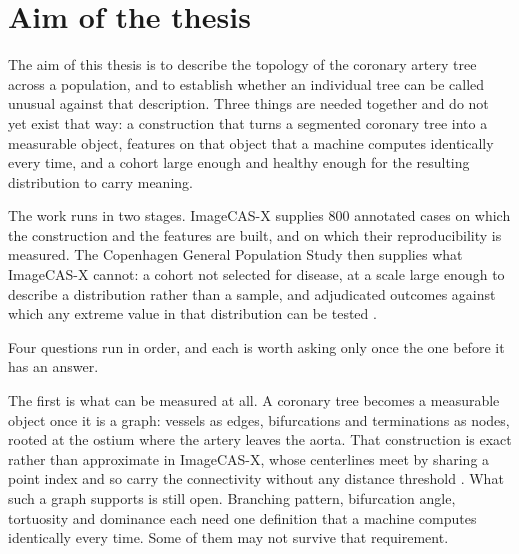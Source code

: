 %
%
%

\section{Aim of the thesis}
\label{sec:aims}

The aim of this thesis is to describe the topology of the coronary artery tree across a population,
and to establish whether an individual tree can be called unusual against that description.
Three things are needed together and do not yet exist that way: a construction that turns a
segmented coronary tree into a measurable object, features on that object that a machine computes
identically every time, and a cohort large enough and healthy enough for the resulting distribution
to carry meaning.

The work runs in two stages.
ImageCAS-X supplies 800 annotated cases on which the construction and the features are built, and
on which their reproducibility is measured.
The Copenhagen General Population Study then supplies what ImageCAS-X cannot: a cohort not selected
for disease, at a scale large enough to describe a distribution rather than a sample, and
adjudicated outcomes against which any extreme value in that distribution can be tested
\cite{fuchs2023cgps}.

Four questions run in order, and each is worth asking only once the one before it has an answer.

The first is what can be measured at all.
A coronary tree becomes a measurable object once it is a graph: vessels as edges, bifurcations and
terminations as nodes, rooted at the ostium where the artery leaves the aorta.
That construction is exact rather than approximate in ImageCAS-X, whose centerlines meet by sharing
a point index and so carry the connectivity without any distance threshold
\cite{bransby2026imagecasx}.
What such a graph supports is still open.
Branching pattern, bifurcation angle, tortuosity and dominance each need one definition that a
machine computes identically every time.
Some of them may not survive that requirement.


